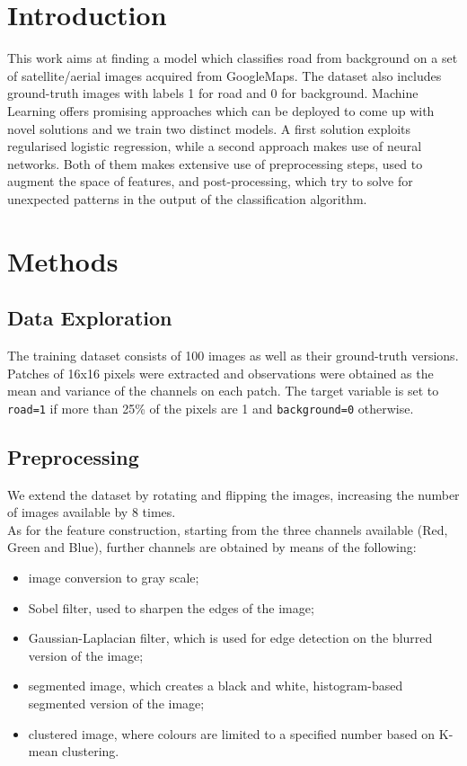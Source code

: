 \documentclass[%
 reprint,
 amsmath,amssymb,
 aps,
]{revtex4-1}
\begin{document}
\section{\label{sec:level1}Introduction}
This work aims at finding a model which classifies road from background on a set of satellite/aerial images acquired from GoogleMaps. The dataset also includes ground-truth images with labels 1 for road and 0 for background. Machine Learning offers promising approaches which can be deployed to come up with novel solutions and we train two distinct models. A first solution exploits regularised logistic regression, while a second approach makes use of neural networks. Both of them makes extensive use of preprocessing steps, used to augment the space of features, and post-processing, which try to solve for unexpected patterns in the output of the classification algorithm.

\section{\label{sec:level1}Methods}

\subsection{\label{sec:level2}Data Exploration} 
The training dataset consists of 100 images as well as their ground-truth versions. Patches of 16x16 pixels were extracted and observations were obtained as the mean and variance of the channels on each patch. The target variable is set to \texttt{road=1} if more than 25\% of the pixels are 1 and \texttt{background=0} otherwise. 
\subsection{\label{sec:level2}Preprocessing} 
We extend the dataset by rotating and flipping the images, increasing the number of images available by 8 times.\\
As for the feature construction, starting from the three channels available (Red, Green and Blue), further channels are obtained by means of the following:
\begin{itemize}
\item image conversion to gray scale; 
\item Sobel filter, used to sharpen the edges of the image;
\item Gaussian-Laplacian filter, which is used for edge detection on the   blurred version of the image;
\item segmented image, which creates a black and white, histogram-based segmented version of the image;
\item clustered image, where colours are limited to a specified number based on K-mean clustering. 
\end{itemize} 
\end{document}
